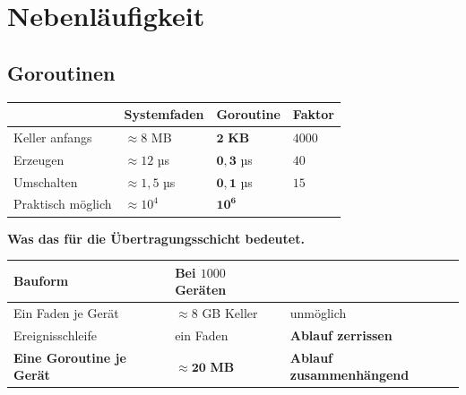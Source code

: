 \part{Nebenläufigkeit}

\chapter{Goroutinen}\label{kap:goroutinen}

\begin{merksatz}
\begin{center}
\renewcommand{\arraystretch}{1.5}
\begin{tabular}{@{}P{3.0cm}P{2.2cm}P{2.2cm}P{1.6cm}@{}}
\toprule
& \textbf{System\-faden} & \textbf{Goroutine} & \textbf{Faktor}\\
\midrule
Keller anfangs & $\approx8$ MB & $\mathbf{2}$ \textbf{KB} & $4000$\\
Erzeugen & $\approx12$ µs & $\mathbf{0{,}3}$ µs & $40$\\
Umschalten & $\approx1{,}5$ µs & $\mathbf{0{,}1}$ µs & $15$\\
Praktisch möglich & $\approx10^4$ & $\mathbf{10^6}$ & \\
\bottomrule
\end{tabular}
\end{center}

\begin{center}
\begin{minipage}{0.88\textwidth}
\end{minipage}
\end{center}

\textbf{Was das für die Übertragungsschicht bedeutet.}

\begin{center}
\renewcommand{\arraystretch}{1.5}
\begin{tabular}{@{}P{2.8cm}P{2.6cm}P{2.8cm}@{}}
\toprule
\textbf{Bauform} & \textbf{Bei $1000$ Geräten} & \\
\midrule
Ein Faden je Gerät & \textcolor{akzent}{$\approx8$ GB Keller} & \textcolor{akzent}{unmöglich}\\
Ereignisschleife & \textcolor{gruen}{ein Faden} & \textcolor{akzent}{\textbf{Ablauf zerrissen}}\\
\textbf{Eine Goroutine je Gerät} & \textcolor{gruen}{$\approx\mathbf{20}$ \textbf{MB}} & \textcolor{gruen}{\textbf{Ablauf zusammenhängend}}\\
\bottomrule
\end{tabular}
\end{center}


\end{merksatz}
